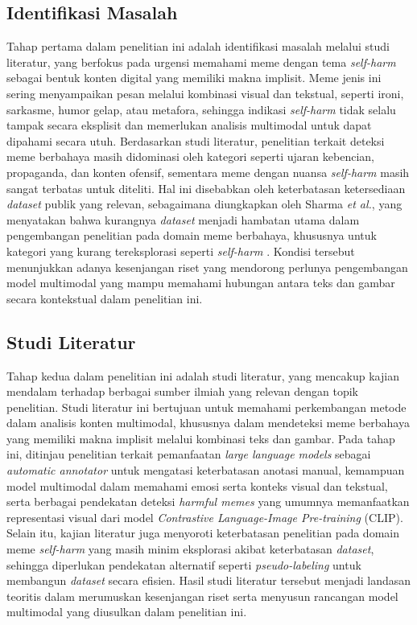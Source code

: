 \subsection{Identifikasi Masalah} \label{subsec:identifikasi_masalah}
Tahap pertama dalam penelitian ini adalah identifikasi masalah  melalui studi literatur, yang berfokus pada urgensi memahami meme dengan tema \textit{self-harm} sebagai bentuk konten digital yang memiliki makna implisit. Meme jenis ini sering menyampaikan pesan melalui kombinasi visual dan tekstual, seperti ironi, sarkasme, humor gelap, atau metafora, sehingga indikasi \textit{self-harm} tidak selalu tampak secara eksplisit dan memerlukan analisis multimodal untuk dapat dipahami secara utuh. Berdasarkan studi literatur, penelitian terkait deteksi meme berbahaya masih didominasi oleh kategori seperti ujaran kebencian, propaganda, dan konten ofensif, sementara meme dengan nuansa \textit{self-harm} masih sangat terbatas untuk diteliti. Hal ini disebabkan oleh keterbatasan ketersediaan \textit{dataset} publik yang relevan, sebagaimana diungkapkan oleh Sharma \textit{et al.}, yang menyatakan bahwa kurangnya \textit{dataset} menjadi hambatan utama dalam pengembangan penelitian pada domain meme berbahaya, khususnya untuk kategori yang kurang tereksplorasi seperti \textit{self-harm} \cite{Sharma2022HarmfulMemes}. Kondisi tersebut menunjukkan adanya kesenjangan riset yang mendorong perlunya pengembangan model multimodal yang mampu memahami hubungan antara teks dan gambar secara kontekstual dalam penelitian ini.

\subsection{Studi Literatur} \label{subsec:studi_literatur}
Tahap kedua dalam penelitian ini adalah studi literatur, yang mencakup kajian mendalam terhadap berbagai sumber ilmiah yang relevan dengan topik penelitian. Studi literatur ini bertujuan untuk memahami perkembangan metode dalam analisis konten multimodal, khususnya dalam mendeteksi meme berbahaya yang memiliki makna implisit melalui kombinasi teks dan gambar. Pada tahap ini, ditinjau penelitian terkait pemanfaatan \textit{large language models} sebagai \textit{automatic annotator} untuk mengatasi keterbatasan anotasi manual, kemampuan model multimodal dalam memahami emosi serta konteks visual dan tekstual, serta berbagai pendekatan deteksi \textit{harmful memes} yang umumnya memanfaatkan representasi visual dari model \textit{Contrastive Language-Image Pre-training} (CLIP). Selain itu, kajian literatur juga menyoroti keterbatasan penelitian pada domain meme \textit{self-harm} yang masih minim eksplorasi akibat keterbatasan \textit{dataset}, sehingga diperlukan pendekatan alternatif seperti \textit{pseudo-labeling} untuk membangun \textit{dataset} secara efisien. Hasil studi literatur tersebut menjadi landasan teoritis dalam merumuskan kesenjangan riset serta menyusun rancangan model multimodal yang diusulkan dalam penelitian ini.

